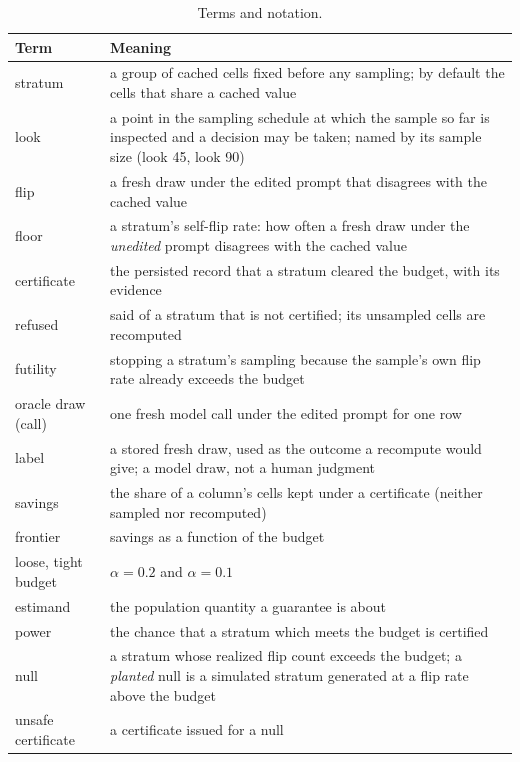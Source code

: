\begin{table}[t]
\caption{Terms and notation.}
\label{tab:notation}
\centering\footnotesize
\begin{minipage}[t]{0.49\textwidth}
\vspace{0pt}
\begin{tabular}{@{}>{\raggedright\arraybackslash}p{1.9cm}>{\raggedright\arraybackslash}p{6.2cm}@{}}
\toprule
Term & Meaning \\
\midrule
stratum & a group of cached cells fixed before any sampling; by default the cells that share a cached value \\
look & a point in the sampling schedule at which the sample so far is inspected and a decision may be taken; named by its sample size (look 45, look 90) \\
flip & a fresh draw under the edited prompt that disagrees with the cached value \\
floor & a stratum's self-flip rate: how often a fresh draw under the \emph{unedited} prompt disagrees with the cached value \\
certificate & the persisted record that a stratum cleared the budget, with its evidence \\
refused & said of a stratum that is not certified; its unsampled cells are recomputed \\
futility & stopping a stratum's sampling because the sample's own flip rate already exceeds the budget \\
oracle draw (call) & one fresh model call under the edited prompt for one row \\
label & a stored fresh draw, used as the outcome a recompute would give; a model draw, not a human judgment \\
savings & the share of a column's cells kept under a certificate (neither sampled nor recomputed) \\
frontier & savings as a function of the budget \\
loose, tight budget & $\alpha{=}0.2$ and $\alpha{=}0.1$ \\
estimand & the population quantity a guarantee is about \\
power & the chance that a stratum which meets the budget is certified \\
null & a stratum whose realized flip count exceeds the budget; a \emph{planted} null is a simulated stratum generated at a flip rate above the budget \\
unsafe certificate & a certificate issued for a null \\

\end{tabular}
\end{minipage}
\end{table}
